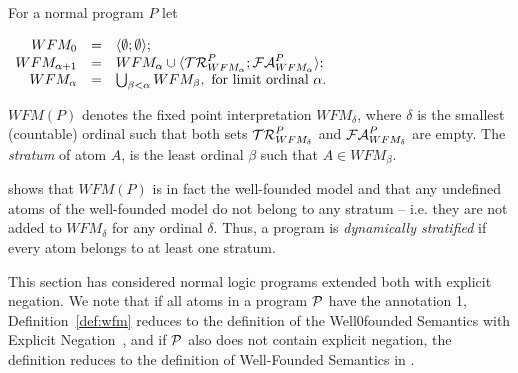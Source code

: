 \begin{definition} \label{def:wfm}
\label{def:IFP}
For a normal program $P$ let 

\begin{center}
$  \begin{array}{rcl}
          WFM_0 & = & \langle \emptyset ; \emptyset \rangle;      \\
 WFM_{\alpha+1} & = &       WFM_{\alpha} \cup
                                \langle \kcaltrue^P_{WFM_\alpha};\calfalse^P_{WFM_\alpha} \rangle; \\
     WFM_\alpha & = & \bigcup_{\beta < \alpha} WFM_\beta, \mbox{ for limit ordinal }\alpha.
  \end{array}
$
\end{center}

\noindent
  $WFM(P)$ denotes the fixed point interpretation $WFM_\delta$,
  where $\delta$ is the smallest (countable) ordinal such that both
  sets $\mathcal{TR}^P_{WFM_\delta}$ and $\calfalse^P_{WFM_\delta}$ are empty.
The {\em stratum} of atom $A$, is the least ordinal $\beta$ such that
   $A \in WFM_{\beta}$.
\end{definition}
%
\cite{Przy89d} shows that %
$WFM(P)$ is in fact the well-founded model and that any undefined
atoms of the well-founded model do not belong to any stratum --
i.e. they are not added to $WFM_{\delta}$ for any ordinal
$\delta$. Thus, a program is \emph{dynamically stratified} if every
atom belongs to at least one stratum.

This section has considered normal logic programs extended both with
explicit negation.  We note that if all atoms in a program $\cP$ have
the annotation 1, Definition~\ref{def:wfm} reduces to the definition
of the Well0founded Semantics with Explicit Negation~\cite{AlDP95},
and if $\cP$ also does not contain explicit negation, the definition
reduces to the definition of Well-Founded Semantics in \cite{Przy89d}.


%


